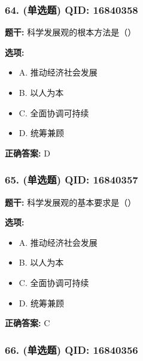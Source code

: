 \documentclass[12pt,UTF8]{ctexart}
\begin{document}
\vspace{0.3em}\hrulefill\vspace{0.7em}

\subsubsection*{64. (单选题) \small QID: 16840358}

\textbf{题干:}
科学发展观的根本方法是（）

\textbf{选项:}
\begin{itemize}[leftmargin=*]

  \item A. 推动经济社会发展

  \item B. 以人为本

  \item C. 全面协调可持续

  \item D. 统筹兼顾

\end{itemize}

\textbf{正确答案:}
D

\vspace{0.3em}\hrulefill\vspace{0.7em}

\subsubsection*{65. (单选题) \small QID: 16840357}

\textbf{题干:}
科学发展观的基本要求是（）

\textbf{选项:}
\begin{itemize}[leftmargin=*]

  \item A. 推动经济社会发展

  \item B. 以人为本

  \item C. 全面协调可持续

  \item D. 统筹兼顾

\end{itemize}

\textbf{正确答案:}
C

\vspace{0.3em}\hrulefill\vspace{0.7em}

\subsubsection*{66. (单选题) \small QID: 16840356}
\end{document}
